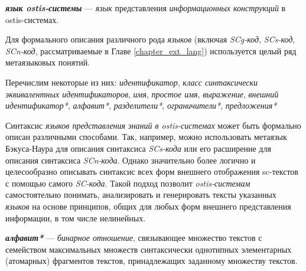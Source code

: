 \textbf{\textit{язык ostis-системы}} --- \textit{язык} представления \textit{информационных конструкций} в ostis-системах.

\begin{SCn}


    \begin{scnindent}
    \end{scnindent}

\end{SCn}

Для формального описания различного рода \textit{языков} (включая \textit{SCg-код}, \textit{SCs-код}, \textit{SCn-код}, рассматриваемые в Главе \ref{chapter_ext_lang}) используется целый ряд метаязыковых понятий.

Перечислим некоторые из них: \textit{идентификатор}, \textit{класс синтаксически эквивалентных идентификаторов}, \textit{имя}, \textit{простое имя}, \textit{выражение}, \textit{внешний идентификатор*}, \textit{алфавит*}, \textit{разделители*}, \textit{ограничители*}, \textit{предложения*}

Синтаксис \textit{языков представления знаний в ostis-системах} может быть формально описан различными способами.
Так, например, можно использовать метаязык Бэкуса-Наура для описания синтаксиса \textit{SCs-кода} или его расширение для описания синтаксиса \textit{SCn-кода}.
Однако значительно более логично и целесообразно описывать синтаксис всех форм внешнего отображения sc-текстов с помощью самого \textit{SC-кода}.
Такой подход позволит \textit{ostis-системам} самостоятельно понимать, анализировать и генерировать тексты указанных \textit{языков} на основе принципов, общих для любых форм внешнего представления информации, в том числе нелинейных.

\textbf{\textit{алфавит*}} --- \textit{бинарное отношение}, связывающее множество текстов с  семейством максимальных множеств синтаксически однотипных элементарных (атомарных) фрагментов текстов, принадлежащих заданному множеству текстов.

\begin{SCn}



\end{SCn}

